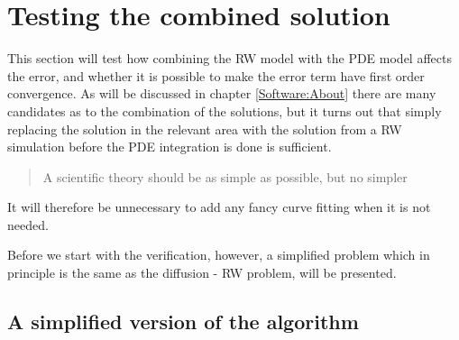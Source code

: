 \section{Testing the combined solution}

This section will test how combining the RW model with the PDE model affects the error, and whether it is possible to make the error term have first order convergence.
As will be discussed in chapter \ref{Software:About} there are many candidates as to the combination of the solutions, but it turns out that simply replacing the solution in the relevant area with the solution from a RW simulation before the PDE integration is done is sufficient. 
\begin{quotation}
 A scientific theory should be as simple as possible, but no simpler
\end{quotation}
It will therefore be unnecessary to add any fancy curve fitting when it is not needed. 

Before we start with the verification, however, a simplified problem which in principle is the same as the diffusion - RW problem, will be presented.

\subsection{A simplified version of the algorithm}\label{simplified_test}

